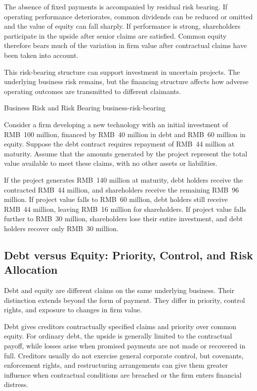 The absence of fixed payments is accompanied by
residual risk bearing. If operating performance
deteriorates, common dividends can be reduced or
omitted and the value of equity can fall sharply.
If performance is strong, shareholders participate
in the upside after senior claims are satisfied.
Common equity therefore bears much of the variation
in firm value after contractual claims have been
taken into account.

This risk-bearing structure can support investment
in uncertain projects. The underlying business risk
remains, but the financing structure affects how
adverse operating outcomes are transmitted to
different claimants.

\begin{example}{Business Risk and Risk Bearing}
{business-risk-bearing}

Consider a firm developing a new technology with an
initial investment of RMB~100 million, financed by
RMB~40 million in debt and RMB~60 million in equity.
Suppose the debt contract requires repayment of
RMB~44 million at maturity. Assume that the amounts
generated by the project represent the total value
available to meet these claims, with no other assets
or liabilities.

If the project generates RMB~140 million at maturity,
debt holders receive the contracted RMB~44 million,
and shareholders receive the remaining RMB~96 million.
If project value falls to RMB~60 million, debt holders
still receive RMB~44 million, leaving RMB~16 million
for shareholders. If project value falls further to
RMB~30 million, shareholders lose their entire
investment, and debt holders recover only RMB~30 million.


\end{example}

\subsection{Debt versus Equity: Priority, Control, and Risk Allocation}

Debt and equity are different claims on the same underlying business. Their distinction extends beyond the form of payment. They differ in priority, control rights, and exposure to changes in firm value.

Debt gives creditors contractually specified claims and priority over common equity. For ordinary debt, the upside is generally limited to the contractual payoff, while losses arise when promised payments are not made or recovered in full. Creditors usually do not exercise general corporate control, but covenants, enforcement rights, and restructuring arrangements can give them greater influence when contractual conditions are breached or the firm enters financial distress.



